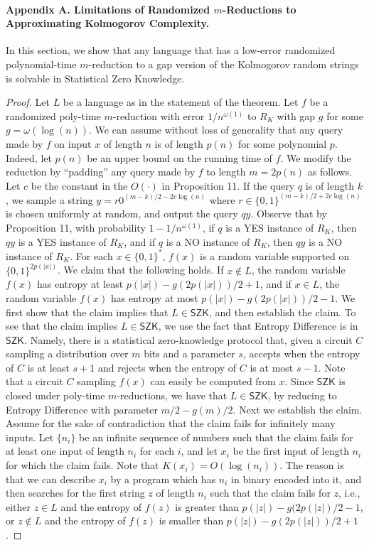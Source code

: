 \documentclass[10pt,a4paper]{article}
\begin{document}
\paragraph{Appendix A. Limitations of Randomized $m$-Reductions to Approximating Kolmogorov Complexity.}
In this section, we show that any language that has a low-error randomized polynomial-time $m$-reduction to a gap version of the Kolmogorov random strings is solvable in Statistical Zero Knowledge.
\begin{proof}
Let $L$ be a language as in the statement of the theorem. Let $f$ be a randomized poly-time $m$-reduction with error $1/n^{\omega(1)}$ to $R_K$ with gap $g$ for some $g=\omega(\log(n))$.
We can assume without loss of generality that any query made by $f$ on input $x$ of length $n$ is of length $p(n)$ for some polynomial $p$. Indeed, let $p(n)$ be an upper bound on the running time of $f$. We modify the reduction by ``padding'' any query made by $f$ to length $m=2p(n)$ as follows. Let $c$ be the constant in the $O(\cdot)$ in Proposition 11. If the query $q$ is of length $k$, we sample a string $y=r0^{(m-k)/2-2c\log(n)}$ where $r\in\{0,1\}^{(m-k)/2+2c\log(n)}$ is chosen uniformly at random, and output the query $qy$. Observe that by Proposition 11, with probability $1-1/n^{\omega(1)}$, if $q$ is a YES instance of $R_K$, then $qy$ is a YES instance of $R_K$, and if $q$ is a NO instance of $R_K$, then $qy$ is a NO instance of $R_K$.
For each $x\in\{0,1\}^*$, $f(x)$ is a random variable supported on $\{0,1\}^{2p(|x|)}$. We claim that the following holds. If $x\notin L$, the random variable $f(x)$ has entropy at least $p(|x|)-g(2p(|x|))/2+1$, and if $x\in L$, the random variable $f(x)$ has entropy at most $p(|x|)-g(2p(|x|))/2-1$.
We first show that the claim implies that $L\in\mathsf{SZK}$, and then establish the claim. To see that the claim implies $L\in\mathsf{SZK}$, we use the fact that Entropy Difference is in $\mathsf{SZK}$. Namely, there is a statistical zero-knowledge protocol that, given a circuit $C$ sampling a distribution over $m$ bits and a parameter $s$, accepts when the entropy of $C$ is at least $s+1$ and rejects when the entropy of $C$ is at most $s-1$. Note that a circuit $C$ sampling $f(x)$ can easily be computed from $x$. Since $\mathsf{SZK}$ is closed under poly-time $m$-reductions, we have that $L\in\mathsf{SZK}$, by reducing to Entropy Difference with parameter $m/2-g(m)/2$.
Next we establish the claim. Assume for the sake of contradiction that the claim fails for infinitely many inputs. Let $\{n_i\}$ be an infinite sequence of numbers such that the claim fails for at least one input of length $n_i$ for each $i$, and let $x_i$ be the first input of length $n_i$ for which the claim fails. Note that $K(x_i)=O(\log(n_i))$. The reason is that we can describe $x_i$ by a program which has $n_i$ in binary encoded into it, and then searches for the first string $z$ of length $n_i$ such that the claim fails for $z$, i.e., either $z\in L$ and the entropy of $f(z)$ is greater than $p(|z|)-g(2p(|z|)/2-1$, or $z\notin L$ and the entropy of $f(z)$ is smaller than $p(|z|)-g(2p(|z|))/2+1$.

\end{proof}
\end{document}
